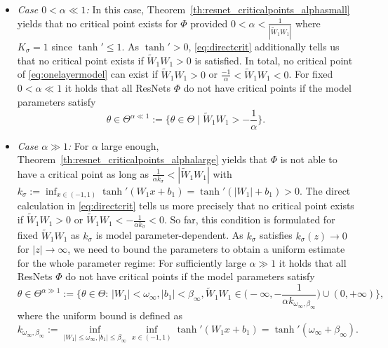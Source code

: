 \documentclass[10pt]{article}
\theoremstyle{definition}
\numberwithin{equation}{section}
\newcommand{\Wt}{\widetilde{W}}
\begin{document}
\begin{itemize}
    \item \emph{Case $0 < \alpha \ll 1$:} In this case, Theorem~\ref{th:resnet_criticalpoints_alphasmall} yields that no critical point exists for $\Phi$ provided  $0 < \alpha < \frac{1}{ |\Wt_1 W_1|}$ where $K_\sigma = 1$ since $\tanh' \leq 1$.
    As $\tanh' > 0$, \eqref{eq:directcrit} additionally tells us that no critical point exists if $\Wt_1 W_1 > 0$ is satisfied. In total, no critical point of \eqref{eq:onelayermodel} can exist if $\Wt_1 W_1 > 0$ or $\frac{-1}{\alpha}<\Wt_1 W_1 < 0$. For fixed $0 < \alpha \ll 1$ it holds that all ResNets $\Phi$  do not have critical points if the model parameters satisfy
    \begin{equation}\label{eq:thetaalphasmall}
     \theta \in \Theta^{\alpha \ll 1} := \Big\{ \theta \in \Theta \mid \Wt_1 W_1  > -\frac{1}{\alpha} \Big\}. %
    \end{equation}
   

    \item \emph{Case $\alpha \gg 1$:} For $\alpha$ large enough, Theorem~\ref{th:resnet_criticalpoints_alphalarge} yields that $\Phi$ is not able to have a critical point as long as $\frac{1}{\alpha k_\sigma} <|\Wt_1 W_1| $ with $k_\sigma:=\inf_{x\in (-1,1)} \tanh'(W_1x + b_1)  = \tanh'(|W_1| + b_1)> 0$. The direct calculation in \eqref{eq:directcrit} tells us more precisely that no critical point exists if $\Wt_1 W_1 > 0$ or $\Wt_1W_1 < -\frac{1}{\alpha k_\sigma} < 0$. So far, this condition is formulated for fixed $\Wt_1W_1$ as $k_\sigma$ is model parameter-dependent. As $k_\sigma$ satisfies $k_\sigma(z) \to 0$ for $|z| \to \infty$, we need to bound the parameters to obtain a uniform estimate for the whole parameter regime:
    For sufficiently large $\alpha \gg 1$ it holds that all ResNets $\Phi$  do not have critical points if  the model parameters satisfy
    \begin{equation}\label{eq:thetaalphalarge}
        \theta \in \Theta^{\alpha \gg 1} := \Big\{ \theta \in \Theta :\, |W_1| < \omega_\infty, |b_1| < \beta_\infty, \Wt_1 W_1 \in \Big(-\infty, -\frac{1}{\alpha k_{\omega_\infty, \beta_\infty}}\Big)\cup (0, +\infty)\Big\},
    \end{equation}
    where the uniform bound is defined as
    \begin{equation}\label{eq:lowerk}
    k_{\omega_\infty, \beta_\infty}:= \inf_{|W_1| \le \omega_\infty, |b_1|\le \beta_\infty} \inf_{x\in(-1,1)} \tanh'(W_1x + b_1) = \tanh'(\omega_\infty + \beta_\infty).
    \end{equation}


\end{itemize}
\end{document}
